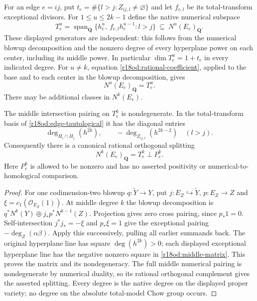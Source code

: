 For an edge $e=ij$, put $t_e=\#\{l>j:Z_{ij,l}\ne\varnothing\}$
and let $f_{e,l}$ be its total-transform exceptional divisors.
For $1\le u\le 2k-1$ define the native numerical subspace
\[
 T_e^u=\operatorname{span}_{\mathbf Q}
       \{h_e^u,\ f_{e,l}h_e^{u-1}:l>j\}
             \ \subseteq\ N^u(E_e)_{\mathbf Q}.
 \tag{OD18.4}\label{r18od:edge-tautological}
\]
These displayed generators are independent: this follows from
the numerical blowup decomposition and the nonzero degree of
every hyperplane power on each center, including its middle
power.  In particular $\dim T_e^u=1+t_e$ in every indicated degree.
For $u\ne k$, equation \eqref{r18od:rational-coefficient}, applied
to the base and to each center in the blowup decomposition, gives
\[
                          N^u(E_e)_{\mathbf Q}=T_e^u.
 \tag{OD18.5}\label{r18od:only-middle-extra}
\]
There may be additional classes in $N^k(E_e)$.

\begin{lemma}
\label{r18od:middle-splitting}
The middle intersection pairing on $T_e^k$ is nondegenerate.
In the total-transform basis of \eqref{r18od:edge-tautological}
it has the diagonal entries
\[
       \deg_{H_i\cap H_j}(h^{2k}),\qquad
                      -\deg_{Z_{ij,l}}(h^{2k-2})\quad(l>j).
 \tag{OD18.6}\label{r18od:middle-matrix}
\]
Consequently there is a canonical rational orthogonal splitting
\[
     N^k(E_e)_{\mathbf Q}=T_e^k\mathbin{\perp}P_e^k.
 \tag{OD18.7}\label{r18od:middle-orthogonal}
\]
Here $P_e^k$ is allowed to be nonzero and has no asserted
positivity or numerical-to-homological comparison.
\end{lemma}

\begin{proof}
For one codimension-two blowup $q:\widetilde Y\to Y$, put
$j:E_Z\hookrightarrow\widetilde Y$, $p:E_Z\to Z$ and
$\xi=c_1(\mathcal O_{E_Z}(1))$.  At middle degree $k$ the
blowup decomposition is $q^*N^k(Y)\oplus j_*p^*N^{k-1}(Z)$.
Projection gives zero cross pairing, since $p_*1=0$.
Self-intersection $j^*j_*=-\xi$ and $p_*\xi=1$ give the
exceptional pairing $-\deg_Z(\alpha\beta)$.
Apply this successively, pulling all earlier summands back.
The original hyperplane line has square $\deg(h^{2k})>0$;
each displayed exceptional hyperplane line has the negative
nonzero square in \eqref{r18od:middle-matrix}.
This proves the matrix and its nondegeneracy.  The full middle
numerical pairing is nondegenerate by numerical duality, so
its rational orthogonal complement gives the asserted splitting.
Every degree is the native degree on the displayed proper
variety; no degree on the absolute total-model Chow group occurs.
\end{proof}

